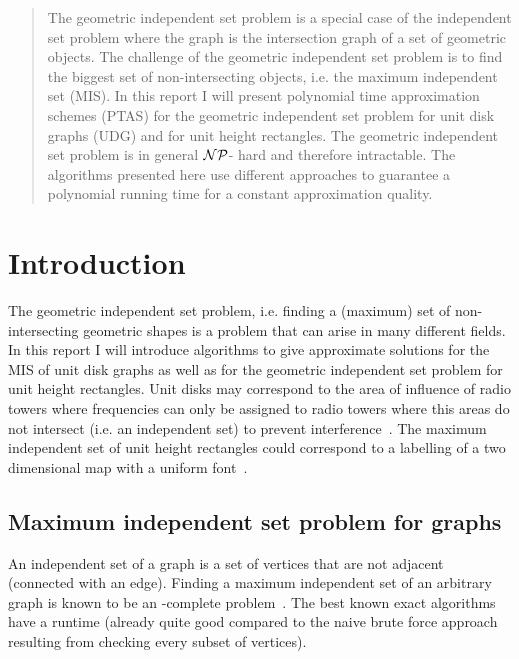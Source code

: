 \maketitle
\begin{abstract}
The geometric independent set problem is a special case of the independent set problem where the graph is the intersection graph of a set of geometric objects. The challenge of the geometric independent set problem is to find the biggest set of non-intersecting objects, i.e. the maximum independent set  (MIS). In this report I will present polynomial time approximation schemes (PTAS) for the geometric independent set problem for unit disk graphs (UDG) and for unit height rectangles. The geometric independent set problem is in general $\mathcal{NP}$- hard and therefore intractable. The algorithms presented here use different approaches to guarantee a polynomial running time for a constant approximation quality.
\end{abstract}

\tableofcontents



\section{Introduction}
The geometric independent set problem, i.e. finding a (maximum) set of non-intersecting geometric shapes is a problem that can arise in many different fields. In this report I will introduce algorithms to give approximate solutions for the MIS of unit disk graphs as well as for the geometric independent set problem for unit height rectangles. Unit disks may correspond to the area of influence of radio towers where frequencies can only be assigned to radio towers where this areas do not intersect (i.e. an independent set) to prevent interference~\cite{chamaret}. The maximum independent set of unit height rectangles could correspond to a labelling of a two dimensional map with a uniform font~\cite{agarwallabel}.
\subsection{Maximum independent set problem for graphs}
An independent set of a graph is a set of vertices that are not adjacent (connected with an edge). Finding a maximum independent set of an arbitrary graph is known to be an \NP-complete problem~\cite{misnp}. The best known exact algorithms have a runtime  \cite{exacta,exactb} (already quite good compared to the  naive brute force approach resulting from checking every subset of vertices).

